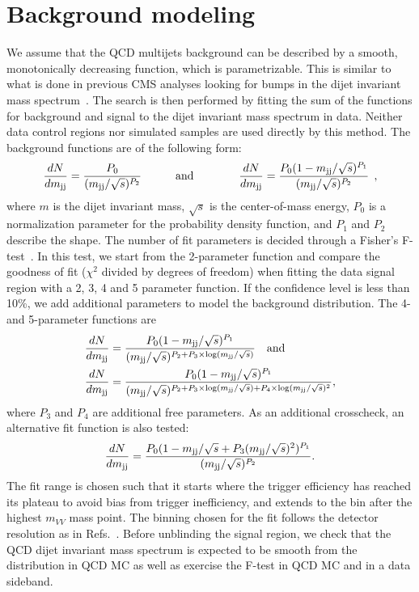 \section{Background modeling}
\label{sec:searchI:bkg}
We assume that the QCD multijets background can be described by a smooth, monotonically decreasing function, which is parametrizable. This is similar to what is done in previous CMS analyses looking for bumps in the dijet invariant mass spectrum~\cite{Chatrchyan:2012ypy,CMS-PAS-EXO-12-059}. The search is then performed by fitting the sum of the functions for background and signal to the dijet invariant mass spectrum in data. Neither data control regions nor simulated samples are used directly by this method. The background functions are of the following form:
\begin{equation}
\label{eq:dijet1}
\frac{dN}{dm_\mathrm{jj}}= \frac{ P_0 } { (m_\mathrm{jj}/\sqrt{s})^{P_2} }\quad\quad\quad{\rm and}
\quad\quad\quad\quad
\frac{dN}{dm_\mathrm{jj}}= \frac{ P_0(1-m_\mathrm{jj}/\sqrt{s})^{P_1} } { (m_\mathrm{jj}/\sqrt{s})^{P_2} }\:\:,
\end{equation}
where $m$ is the dijet invariant mass, $\sqrt{s}$ is the center-of-mass energy, $P_0$ is a normalization parameter for the probability density function, and $P_1$ and $ P_2$ describe the shape. The number of fit parameters is decided through a Fisher's F-test~\cite{RePEc:bla:istatr:v:80:y:2012:i:3:p:491-491}. In this test, we start from the 2-parameter function and compare the goodness of fit ($\chi^2$ divided by degrees of freedom) when fitting the data signal region with a 2, 3, 4 and 5 parameter function. If the confidence level is less than 10\%, we add additional parameters to model the background distribution. The 4- and 5-parameter functions are
\begin{align}
\label{eq:dijet2}
\frac{dN}{d m_\mathrm{jj}} &= \frac{ P_0(1-m_\mathrm{jj}/\sqrt{s})^{P_1} } {(m_\mathrm{jj}/\sqrt{s})^{P_2+P_3\times\log(m_\mathrm{jj}/\sqrt{s})} }\quad{\rm and}\\
\frac{dN}{d m_\mathrm{jj}} &= \frac{ P_0(1-m_\mathrm{jj}/\sqrt{s})^{P_1} } {(m_\mathrm{jj}/\sqrt{s})^{P_2+P_3\times\log(m_\mathrm{jj}/\sqrt{s})+P_4\times\log(m_\mathrm{jj}/\sqrt{s})^2} },
\end{align}
where $P_3$ and $P_4$ are additional free parameters. As an additional crosscheck, an alternative fit function is also tested:
\begin{equation}
\label{eq:dijet4}
\frac{dN}{dm_\mathrm{jj}} = \frac{ P_0(1-m_\mathrm{jj} / \sqrt{s}+P_3(m_\mathrm{jj} / \sqrt{s})^2)^{P_1} } { (m_\mathrm{jj}/\sqrt{s})^{P_2} }.
\end{equation}
The fit range is chosen such that it starts where the trigger efficiency has reached its plateau to avoid bias from trigger inefficiency, and extends to the bin after the highest $m_{VV}$ mass point. The binning chosen for the fit follows the detector resolution as in Refs.~\cite{Chatrchyan:2012ypy,CMS-PAS-EXO-12-059}. Before unblinding the signal region, we check that the QCD dijet invariant mass spectrum is expected to be smooth from the distribution in QCD MC as well as exercise the F-test in QCD MC and in a data sideband.\par
